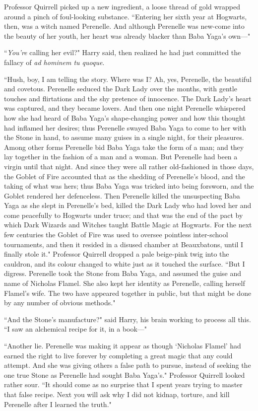 Professor Quirrell picked up a new ingredient, a loose thread of gold wrapped around a pinch of foul-looking substance. ``Entering her sixth year at Hogwarts, then, was a witch named Perenelle. And although Perenelle was new-come into the beauty of her youth, her heart was already blacker than Baba Yaga's own—"

``\emph{You're} calling her evil?" Harry said, then realized he had just committed the fallacy of \emph{ad hominem tu quoque}.

``Hush, boy, I am telling the story. Where was I? Ah, yes, Perenelle, the beautiful and covetous. Perenelle seduced the Dark Lady over the months, with gentle touches and flirtations and the shy pretence of innocence. The Dark Lady's heart was captured, and they became lovers. And then one night Perenelle whispered how she had heard of Baba Yaga's shape-changing power and how this thought had inflamed her desires; thus Perenelle swayed Baba Yaga to come to her with the Stone in hand, to assume many guises in a single night, for their pleasures. Among other forms Perenelle bid Baba Yaga take the form of a man; and they lay together in the fashion of a man and a woman. But Perenelle had been a virgin until that night. And since they were all rather old-fashioned in those days, the Goblet of Fire accounted that as the shedding of Perenelle's blood, and the taking of what was hers; thus Baba Yaga was tricked into being forsworn, and the Goblet rendered her defenceless. Then Perenelle killed the unsuspecting Baba Yaga as she slept in Perenelle's bed, killed the Dark Lady who had loved her and come peacefully to Hogwarts under truce; and that was the end of the pact by which Dark Wizards and Witches taught Battle Magic at Hogwarts. For the next few centuries the Goblet of Fire was used to oversee pointless inter-school tournaments, and then it resided in a disused chamber at Beauxbatons, until I finally stole it." Professor Quirrell dropped a pale beige-pink twig into the cauldron, and its colour changed to white just as it touched the surface. ``But I digress. Perenelle took the Stone from Baba Yaga, and assumed the guise and name of Nicholas Flamel. She also kept her identity as Perenelle, calling herself Flamel's wife. The two have appeared together in public, but that might be done by any number of obvious methods."

``And the Stone's manufacture?" said Harry, his brain working to process all this. ``I saw an alchemical recipe for it, in a book—"

``Another lie. Perenelle was making it appear as though `Nicholas Flamel' had earned the right to live forever by completing a great magic that any could attempt. And she was giving others a false path to pursue, instead of seeking the one true Stone as Perenelle had sought Baba Yaga's." Professor Quirrell looked rather sour. ``It should come as no surprise that I spent years trying to master that false recipe. Next you will ask why I did not kidnap, torture, and kill Perenelle after I learned the truth."

